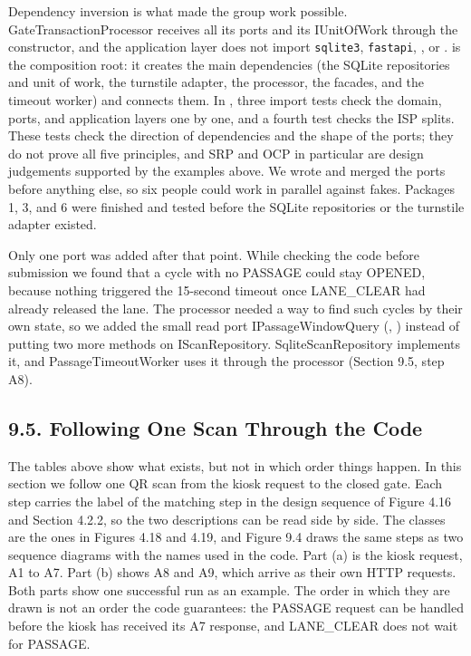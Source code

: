 Dependency inversion is what made the group work possible. GateTransactionProcessor receives all its ports and its IUnitOfWork through the constructor, and the application layer does not import \texttt{sqlite3}, \texttt{fastapi}, , or .  is the composition root: it creates the main dependencies (the SQLite repositories and unit of work, the turnstile adapter, the processor, the facades, and the timeout worker) and connects them. In , three import tests check the domain, ports, and application layers one by one, and a fourth test checks the ISP splits. These tests check the direction of dependencies and the shape of the ports; they do not prove all five principles, and SRP and OCP in particular are design judgements supported by the examples above. We wrote and merged the ports before anything else, so six people could work in parallel against fakes. Packages 1, 3, and 6 were finished and tested before the SQLite repositories or the turnstile adapter existed.

Only one port was added after that point. While checking the code before submission we found that a cycle with no PASSAGE could stay OPENED, because nothing triggered the 15-second timeout once LANE\_CLEAR had already released the lane. The processor needed a way to find such cycles by their own state, so we added the small read port IPassageWindowQuery (, ) instead of putting two more methods on IScanRepository. SqliteScanRepository implements it, and PassageTimeoutWorker uses it through the processor (Section 9.5, step A8).

\subsection*{9.5. Following One Scan Through the Code}

{}

The tables above show what exists, but not in which order things happen. In this section we follow one QR scan from the kiosk request to the closed gate. Each step carries the label of the matching step in the design sequence of Figure 4.16 and Section 4.2.2, so the two descriptions can be read side by side. The classes are the ones in Figures 4.18 and 4.19, and Figure 9.4 draws the same steps as two sequence diagrams with the names used in the code. Part (a) is the kiosk request, A1 to A7. Part (b) shows A8 and A9, which arrive as their own HTTP requests. Both parts show one successful run as an example. The order in which they are drawn is not an order the code guarantees: the PASSAGE request can be handled before the kiosk has received its A7 response, and LANE\_CLEAR does not wait for PASSAGE.

